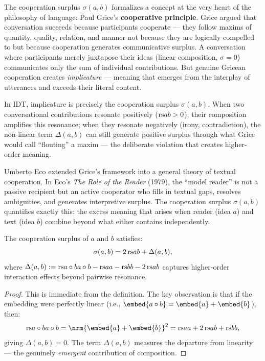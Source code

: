 \begin{interpretation}
\label{interp:ch15:grice_cooperation}
The cooperation surplus $\sigma(a,b)$ formalizes a concept at the very heart
of the philosophy of language: Paul Grice's \textbf{cooperative principle}.
Grice argued that conversation succeeds because participants cooperate ---
they follow maxims of quantity, quality, relation, and manner not because
they are logically compelled to but because cooperation generates
communicative surplus.  A conversation where participants merely
juxtapose their ideas (linear composition, $\sigma = 0$) communicates only
the sum of individual contributions.  But genuine Gricean cooperation
creates \emph{implicature} --- meaning that emerges from the interplay
of utterances and exceeds their literal content.

In IDT, implicature is precisely the cooperation surplus $\sigma(a,b)$.
When two conversational contributions resonate positively ($\mathrm{rs}{a}{b} > 0$),
their composition amplifies this resonance; when they resonate negatively
(irony, contradiction), the non-linear term $\Delta(a,b)$ can still generate
positive surplus through what Grice would call ``flouting'' a maxim ---
the deliberate violation that creates higher-order meaning.

Umberto Eco extended Grice's framework into a general theory of textual
cooperation.  In Eco's \textit{The Role of the Reader} (1979), the ``model
reader'' is not a passive recipient but an active cooperator who fills in
textual gaps, resolves ambiguities, and generates interpretive surplus.
The cooperation surplus $\sigma(a,b)$ quantifies exactly this: the excess
meaning that arises when reader (idea $a$) and text (idea $b$) combine
beyond what either contains independently.
\end{interpretation}

\begin{theorem}
\label{thm:surplus-decomposition}
The cooperation surplus of $a$ and $b$ satisfies:
\[
  \sigma(a, b) = 2\,\mathrm{rs}{a}{b} + \Delta(a, b),
\]
where $\Delta(a, b) := \mathrm{rs}{a \circ b}{a \circ b} - \mathrm{rs}{a}{a} - \mathrm{rs}{b}{b}
- 2\,\mathrm{rs}{a}{b}$ captures higher-order interaction effects beyond pairwise
resonance.
\end{theorem}

\begin{proof}
This is immediate from the definition.  The key observation is that if the
embedding were perfectly linear (i.e., $\embed{a \compose b} = \embed{a} +
\embed{b}$), then:
\[
  \rs{a \compose b}{a \compose b} = \nrm{\embed{a} + \embed{b}}^2
  = \rs{a}{a} + 2\,\rs{a}{b} + \rs{b}{b},
\]
giving $\Delta(a, b) = 0$.  The term $\Delta(a, b)$ measures the departure
from linearity --- the genuinely \emph{emergent} contribution of composition.
\end{proof}

